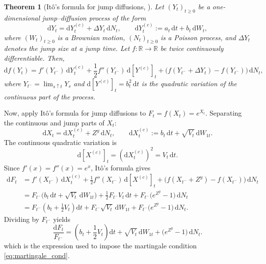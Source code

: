 \documentclass[a4paper,titlepage,12pt]{report}
\theoremstyle{plain}
\newtheorem*{theorem*}{Theorem}
\begin{document}
\begin{theorem*}[It\^{o}'s formula for jump diffusions, \citet{OksendalSulem2007}]
\label{thm:ito_jump}
Let $(Y_t)_{t\ge 0}$ be a one-dimensional jump--diffusion process of the form
\begin{equation}
\mathrm{d}Y_t
=
\mathrm{d}Y_t^{(c)} + \Delta Y_t\,\mathrm{d}N_t,
\qquad
\mathrm{d}Y_t^{(c)} := a_t\,\mathrm{d}t + b_t\,\mathrm{d}W_t,
\label{eq:Y_jump_dynamics}
\end{equation}
where $(W_t)_{t\ge 0}$ is a Brownian motion, $(N_t)_{t\ge 0}$ is a Poisson process, and $\Delta Y_t$
denotes the jump size at a jump time. Let $f:\mathbb{R}\to\mathbb{R}$ be twice continuously
differentiable. Then,
\begin{equation}
\mathrm{d}f(Y_t)
=
f'(Y_{t^-})\,\mathrm{d}Y_t^{(c)}
+
\frac{1}{2}f''(Y_{t^-})\,\mathrm{d}[Y^{(c)}]_t
+
\Big(f(Y_{t^-}+\Delta Y_t)-f(Y_{t^-})\Big)\,\mathrm{d}N_t,
\label{eq:ito_jump_theorem}
\end{equation}
where $Y_{t^-}=\lim_{s\uparrow t}Y_s$ and $\mathrm{d}[Y^{(c)}]_t=b_t^2\,\mathrm{d}t$ is the quadratic variation of the continuous part of the process.
\end{theorem*}

Now, apply It\^{o}'s formula for jump diffusions to $F_t=f(X_t)=e^{X_t}$.  Separating the continuous and jump parts of $X_t$:
\[
\mathrm{d}X_t
=
\mathrm{d}X_t^{(c)} + Z^y\,\mathrm{d}N_t,
\qquad
\mathrm{d}X_t^{(c)} := b_t\,\mathrm{d}t + \sqrt{V_t}\,\mathrm{d}W_{1t}.
\]
The continuous quadratic variation is
\[
\mathrm{d}[X^{(c)}]_t = (\mathrm{d}X_t^{(c)})^2 = V_t\,\mathrm{d}t.
\]
Since $f'(x)=f''(x)=e^x$, It\^{o}'s formula gives
\begin{align}
\mathrm{d}F_t
&=
f'(X_{t^-})\,\mathrm{d}X_t^{(c)}
+\frac12 f''(X_{t^-})\,\mathrm{d}[X^{(c)}]_t
+\Big(f(X_{t^-}+Z^y)-f(X_{t^-})\Big)\,\mathrm{d}N_t
\nonumber\\
&=
F_{t^-}\Big(b_t\,\mathrm{d}t+\sqrt{V_t}\,\mathrm{d}W_{1t}\Big)
+\frac12 F_{t^-}V_t\,\mathrm{d}t
+F_{t^-}\big(e^{Z^y}-1\big)\,\mathrm{d}N_t
\nonumber\\
&=
F_{t^-}\left(b_t+\frac12V_t\right)\mathrm{d}t
+F_{t^-}\sqrt{V_t}\,\mathrm{d}W_{1t}
+F_{t^-}\big(e^{Z^y}-1\big)\,\mathrm{d}N_t.
\label{eq:dF_expanded}
\end{align}
Dividing by $F_{t^-}$ yields
\begin{equation}
\frac{\mathrm{d}F_t}{F_{t^-}}
=
\left(b_t + \frac{1}{2}V_t\right)\mathrm{d}t
+ \sqrt{V_t}\,\mathrm{d}W_{1t}
+ \big(e^{Z^y}-1\big)\,\mathrm{d}N_t.
\label{eq:dF_over_Fminus}
\end{equation}
which is the expression used to impose the martingale condition \eqref{eq:martingale_cond}.
\end{document}

